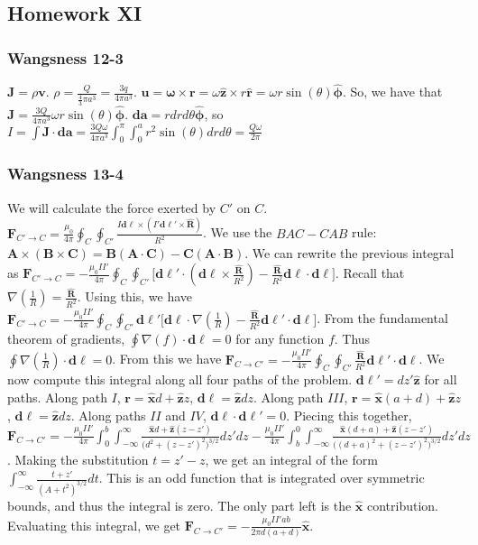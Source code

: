 \documentclass[oneside]{book}
\theoremstyle{definition}
\newcommand*\B[1]{\mathbf{#1}}
\newcommand*\Bh[1]{\mathbf{\hat{#1}}}
\begin{document}
\subsection*{Homework XI}

\subsubsection{Wangsness 12-3}

$\B{J} = \rho \B{v}$. $\rho = \frac{Q}{\frac{4}{3}\pi a^3} = \frac{3q}{4\pi a^3}$. $\B{u} = \B{\omega}\times\B{r} = \omega \Bh{z} \times r \Bh{r} = \omega r \sin(\theta) \Bh{\phi}$. So, we have that $\B{J} = \frac{3Q}{4\pi a^3} \omega r \sin(\theta) \Bh{\phi}$. $\B{da} = rdrd\theta \Bh{\phi}$, so $I = \int \B{J} \cdot \B{da} = \frac{3Q \omega}{4\pi a^3} \int_{0}^{\pi} \int_{0}^{a} r^2\sin(\theta)drd\theta = \frac{Q\omega}{2\pi}$ 

\subsubsection{Wangsness 13-4}

We will calculate the force exerted by $C'$ on $C$. $\B{F}_{C'\rightarrow C} = \frac{\mu_0}{4\pi} \oint_{C} \oint_{C'} \frac{I \B{d\ell}\times (I' \B{d\ell}'\times \Bh{R})}{R^2}$. We use the $BAC-CAB$ rule: $\B{A}\times(\B{B}\times \B{C}) = \B{B}(\B{A}\cdot \B{C}) - \B{C}(\B{A}\cdot \B{B})$. We can rewrite the previous integral as  $\B{F}_{C'\rightarrow C} = -\frac{\mu_0 II'}{4\pi} \oint_{C} \oint_{C'} \big[ \B{d\ell}'\cdot(\B{d\ell}\times \frac{\Bh{R}}{R^2}) - \frac{\Bh{R}}{R^2} \B{d\ell}\cdot \B{d\ell}\big]$. Recall that $\nabla(\frac{1}{R}) = \frac{\Bh{R}}{R^2}$. Using this, we have $\B{F}_{C'\rightarrow C} = -\frac{\mu_0 II'}{4\pi} \oint_{C}\oint_{C'} \B{d\ell'}\big[ \B{d\ell}\cdot \nabla(\frac{1}{R})- \frac{\Bh{R}}{R^2} \B{d\ell'} \cdot \B{d\ell}\big]$. From the fundamental theorem of gradients, $\oint \nabla(f) \cdot \B{d\ell} = 0$ for any function $f$. Thus $\oint \nabla(\frac{1}{R}) \cdot \B{d\ell} = 0$. From this we have $\B{F}_{C\rightarrow C'} = -\frac{\mu_0 II'}{4\pi} \oint_{C}\oint_{C'} \frac{\Bh{R}}{R^2} \B{d\ell}'\cdot \B{d\ell}$. We now compute this integral along all four paths of the problem. $\B{d\ell}' = dz' \Bh{z}$ for all paths. Along path $I$, $\B{r} = \Bh{x}d+\Bh{z}z$, $\B{d\ell} = \Bh{z}dz$. Along path $III$, $\B{r} = \Bh{x}(a+d)+\Bh{z}z$, $\B{d\ell} = \Bh{z}dz$. Along paths $II$ and $IV$, $\B{d\ell}\cdot \B{d\ell}' = 0$. Piecing this together, $\B{F}_{C\rightarrow C'} = -\frac{\mu_0 II'}{4\pi}\int_{0}^{b} \int_{-\infty}^{\infty} \frac{\Bh{x}d+\Bh{z}(z-z')}{\big(d^2+(z-z')^2\big)^{3/2}}dz'dz - \frac{\mu_0 II'}{4\pi} \int_{b}^{0} \int_{-\infty}^{\infty} \frac{\Bh{x}(d+a)+\Bh{z}(z-z')}{\big((d+a)^2+(z-z')^2\big)^{3/2}}dz'dz$. Making the substitution $t=z'-z$, we get an integral of the form $\int_{-\infty}^{\infty} \frac{t+z'}{(A+t^2)^{3/2}}dt$. This is an odd function that is integrated over symmetric bounds, and thus the integral is zero. The only part left is the $\Bh{x}$ contribution. Evaluating this integral, we get $\B{F}_{C\rightarrow C'} = -\frac{\mu_0 II' ab}{2\pi d(a+d)}\Bh{x}$.
\end{document}
